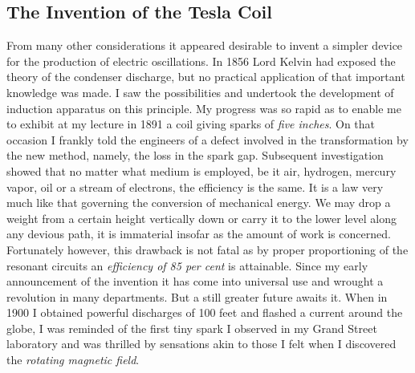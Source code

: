 \documentclass[a4paper,12pt,english,twoside,openright]{memoir}
\begin{document}
\subsection{The Invention of the Tesla Coil}
From many other considerations it appeared desirable to invent a simpler device for the 
production of electric oscillations.  In 1856 Lord Kelvin had exposed the theory of the condenser 
discharge, but no practical application of that important knowledge was made.  I saw the 
possibilities and undertook the development of induction apparatus on this principle.  My progress 
was so rapid as to enable me to exhibit at my lecture in 1891 a coil giving sparks of \emph{five inches}.  
On that occasion I frankly told the engineers of a defect involved in the transformation by the new 
method, namely, the loss in the spark gap.  Subsequent investigation showed that no matter what 
medium is employed, be it air, hydrogen, mercury vapor, oil or a stream of electrons, the 
efficiency is the same.  It is a law very much like that governing the conversion of mechanical 
energy.  We may drop a weight from a certain height vertically down or carry it to the lower level 
along any devious path, it is immaterial insofar as the amount of work is concerned.  Fortunately 
however, this drawback is not fatal as by proper proportioning of the resonant circuits an 
\emph{efficiency of 85 per cent} is attainable.  Since my early announcement of the invention it has come 
into universal use and wrought a revolution in many departments.  But a still greater future awaits 
it.  When in 1900 I obtained powerful discharges of 100 feet and flashed a current around the 
globe, I was reminded of the first tiny spark I observed in my Grand Street laboratory and was 
thrilled by sensations akin to those I felt when I discovered the \emph{rotating magnetic field}.  



	{\centering
		\aldine\\
		\aldine\hspace{1.2em}\aldine
		\par}
	\vspace*{2cm}
	
\end{document}
